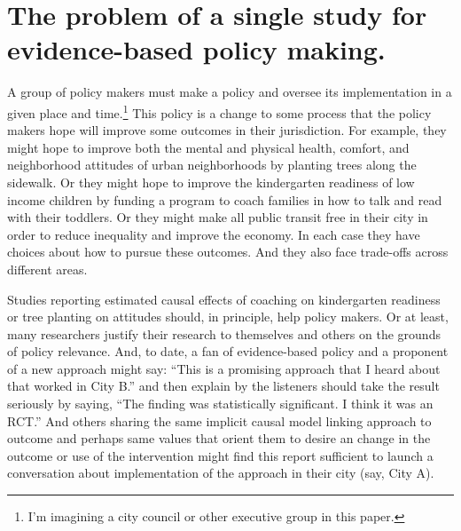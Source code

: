 \documentclass[
  11pt,
]{article}
\begin{document}
\hypertarget{the-problem-of-a-single-study-for-evidence-based-policy-making.}{%
\section{The problem of a single study for evidence-based policy
making.}\label{the-problem-of-a-single-study-for-evidence-based-policy-making.}}

A group of policy makers must make a policy and oversee its
implementation in a given place and time.\footnote{I'm imagining a city
  council or other executive group in this paper.} This policy is a
change to some process that the policy makers hope will improve some
outcomes in their jurisdiction. For example, they might hope to improve
both the mental and physical health, comfort, and neighborhood attitudes
of urban neighborhoods by planting trees along the sidewalk. Or they
might hope to improve the kindergarten readiness of low income children
by funding a program to coach families in how to talk and read with
their toddlers. Or they might make all public transit free in their city
in order to reduce inequality and improve the economy. In each case they
have choices about how to pursue these outcomes. And they also face
trade-offs across different areas.

Studies reporting estimated causal effects of coaching on kindergarten
readiness or tree planting on attitudes should, in principle, help
policy makers. Or at least, many researchers justify their research to
themselves and others on the grounds of policy relevance. And, to date,
a fan of evidence-based policy and a proponent of a new approach might
say: ``This is a promising approach that I heard about that worked in
City B.'' and then explain by the listeners should take the result
seriously by saying, ``The finding was statistically significant. I
think it was an RCT.'' And others sharing the same implicit causal model
linking approach to outcome and perhaps same values that orient them to
desire an change in the outcome or use of the intervention might find
this report sufficient to launch a conversation about implementation of
the approach in their city (say, City A).
\end{document}
